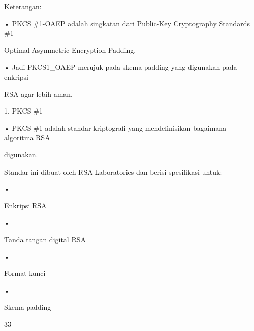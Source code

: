 \documentclass{article}
\begin{document}

Keterangan: 

• PKCS \#1-OAEP adalah singkatan dari Public-Key Cryptography Standards \#1 – 

Optimal Asymmetric Encryption Padding.

• Jadi PKCS1\_OAEP merujuk pada skema padding yang digunakan pada enkripsi 

RSA agar lebih aman.

1. PKCS \#1

• PKCS \#1 adalah standar kriptografi yang mendefinisikan bagaimana algoritma RSA 

digunakan.

Standar ini dibuat oleh RSA Laboratories dan berisi spesifikasi untuk:

•

Enkripsi RSA

•

Tanda tangan digital RSA

•

Format kunci

•

Skema padding

33
\end{document}
